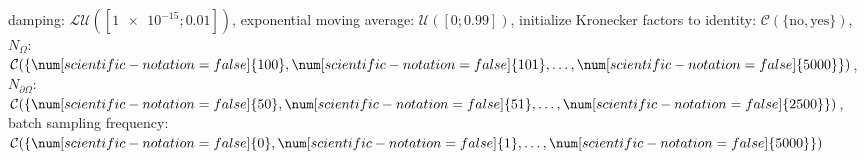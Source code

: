 damping: $\mathcal{LU}([\num[scientific-notation=true]{1e-15}; \num[scientific-notation=true]{0.01}])$, exponential moving average: $\mathcal{U}([\num[scientific-notation=false]{0}; \num[scientific-notation=true]{0.99}])$, initialize Kronecker factors to identity: $\mathcal{C}(\{\text{no},\text{yes}\})$, $N_{\Omega}$: $\mathcal{C}(\{\num[scientific-notation=false]{100},\num[scientific-notation=false]{101},\text{\dots},\num[scientific-notation=false]{5000}\})$, $N_{\partial\Omega}$: $\mathcal{C}(\{\num[scientific-notation=false]{50},\num[scientific-notation=false]{51},\text{\dots},\num[scientific-notation=false]{2500}\})$, batch sampling frequency: $\mathcal{C}(\{\num[scientific-notation=false]{0},\num[scientific-notation=false]{1},\text{\dots},\num[scientific-notation=false]{5000}\})$